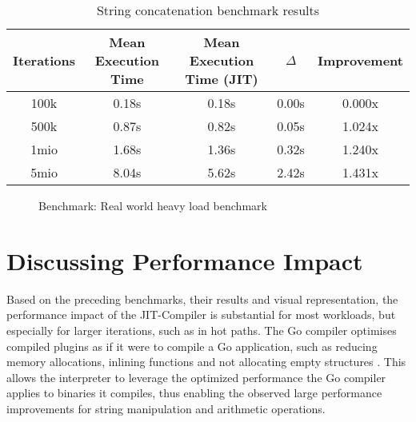 \begin{table}[H]
    \centering
    \begin{tabular}{c|c|c|c|c}
        Iterations & Mean Execution Time & Mean Execution Time (JIT) & $\Delta$ & Improvement \\ 
        \hline
        100k & 0.18s & 0.18s & 0.00s & 0.000x \\
        500k & 0.87s & 0.82s & 0.05s & 1.024x \\
        1mio & 1.68s & 1.36s & 0.32s & 1.240x \\
        5mio & 8.04s & 5.62s & 2.42s & 1.431x\\
    \end{tabular}
    \label{table:benchmark-realworld}
    \caption{String concatenation benchmark results}
\end{table}

\begin{figure}[H]
    \centering
    \caption{Benchmark: Real world heavy load benchmark}
    \label{chart:benchmark-realworld}
\end{figure}

\section{Discussing Performance Impact}

Based on the preceding benchmarks, their results and visual representation, the
performance impact of the JIT-Compiler is substantial for most workloads, but
especially for larger iterations, such as in hot paths. The Go compiler
optimises compiled plugins as if it were to compile a Go application, such as
reducing memory allocations\cite[Escape Analysis]{go_wiki_optimization},
inlining functions\cite[Inlining]{go_wiki_optimization} and not allocating
empty structures \cite[Interface Values]{go_wiki_optimization}. This allows the
interpreter to leverage the optimized performance the Go compiler applies to
binaries it compiles, thus enabling the observed large performance improvements
for string manipulation and arithmetic operations.

